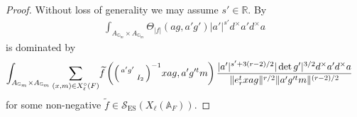 \documentclass[12pt]{amsart}
\theoremstyle{remark}
\numberwithin{equation}{section}
\newcommand{\A}{\mathbb{A}}
\newcommand{\RR}{\mathbb{R}}
\newcommand{\GG}{\mathbb{G}}
\theoremstyle{definition}
\newenvironment{psmatrix}
  {\left(\begin{smallmatrix}}
  {\end{smallmatrix}\right)}
\numberwithin{equation}{subsection}
\newcommand{\norm}[1]{\lVert#1\rVert}
\begin{document}
\begin{proof}
 Without loss of generality we may assume $s' \in \RR.$   By  
\begin{align} \label{theta:int}
\int_{A_{\GG_m} \times A_{\GG_m}}\Theta_{|f|}(ag,a'g')|a'|^{s'}d^\times a' d^\times a
\end{align}
is dominated by  
\begin{align*}
\int_{A_{\GG_m} \times A_{\GG_m}} \sum_{(x,m)\in X_\ell^\circ(F)}&\widetilde{f}\left( \begin{psmatrix} a'g' & \\ & I_2\end{psmatrix}^{-1}xag,a'g'^{t}m\right)\frac{|a'|^{s'+3(r-2)/2}|\det g'|^{3/2}d^\times a'd^\times a}{\norm{e_r^txag}^{r/2}\norm{ a'g'^tm}^{(r-2)/2}} 
\end{align*}
for some non-negative $\widetilde{f} \in \mathcal{S}_{\mathrm{ES}}(X_\ell(\A_F)).$


\end{proof}
\end{document}
